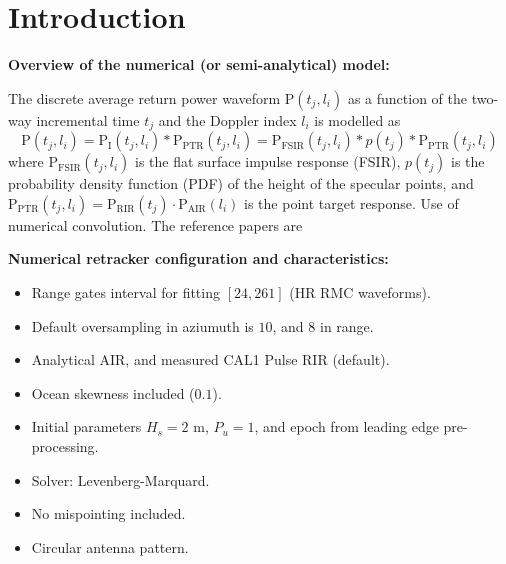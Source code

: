 \documentclass[compress,8pt]{beamer}
\begin{document}
\section{Introduction}
\begin{frame}
 
{\bf Overview of the numerical (or semi-analytical) model:}
 
 \medskip
 
 The discrete average return power waveform $\text{P}(t_j, l_i)$ as a function of the two-way incremental time $t_j$ and the Doppler index $l_i$ is modelled as 
\begin{equation}
 \text{P}(t_j, l_i)=\text{P}_\text{I}(t_j, l_i)\ast \text{P}_\text{PTR}(t_j, l_i) = \text{P}_\text{FSIR}(t_j, l_i) \ast p(t_j)\ast \text{P}_\text{PTR}(t_j, l_i)
 \label{eq:convolution_model}
\end{equation}
where $\text{P}_\text{FSIR}(t_j, l_i)$ is the flat surface impulse response (FSIR), $p(t_j)$ is the probability density function (PDF) of the height of the specular points, and $\text{P}_\text{PTR}(t_j, l_i)=\text{P}_\text{RIR}(t_j)\cdot \text{P}_\text{AIR}( l_i)$ is the point target response. Use of numerical convolution. The reference papers are \citep{Halimi2014a, Halimi2015a}


\bigskip
{\bf Numerical retracker configuration and characteristics:}

\begin{itemize}
 \item Range gates interval for fitting $[24, 261]$ (HR RMC waveforms).
 
 \item Default oversampling in aziumuth is $10$, and $8$ in range.
 
 \item Analytical AIR, and measured CAL1 Pulse RIR (default).
 
 \item Ocean skewness included ($0.1$). %
 
 \item Initial parameters $H_s=2$ m, $P_u=1$, and epoch from leading edge pre-processing.
 
 \item Solver: Levenberg-Marquard.
 
 \item No mispointing included.
 
  \item Circular antenna pattern.
 
 \end{itemize}

 
\end{frame}
\end{document}
